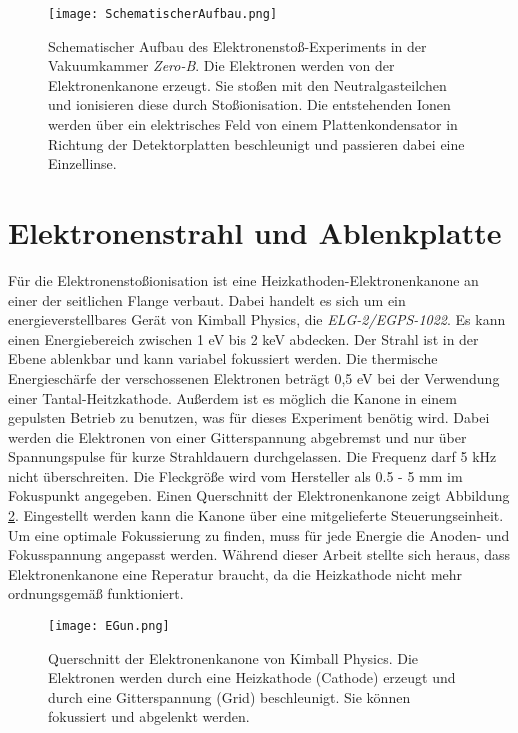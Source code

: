\begin{figure}
    \centering
    \texttt{[image: SchematischerAufbau.png]}
    \caption[Schematischer Aufbau des Experiments]{Schematischer Aufbau des Elektronenstoß-Experiments in der Vakuumkammer \textit{Zero-B}. Die Elektronen werden von der Elektronenkanone erzeugt. Sie stoßen mit den Neutralgasteilchen und ionisieren diese durch Stoßionisation. Die entstehenden Ionen werden über ein elektrisches Feld von einem Plattenkondensator in Richtung der Detektorplatten beschleunigt und passieren dabei eine Einzellinse.}
    \label{fig:Aufbau}
\end{figure}

\section{Elektronenstrahl und Ablenkplatte}
Für die Elektronenstoßionisation ist eine Heizkathoden-Elektronenkanone an einer der seitlichen Flange verbaut. Dabei handelt es sich um ein energieverstellbares Gerät von Kimball Physics, die \textit{ELG-2/EGPS-1022}. Es kann einen Energiebereich zwischen 1 eV bis 2 keV abdecken. Der Strahl ist in der Ebene ablenkbar und kann variabel fokussiert werden. Die thermische Energieschärfe der verschossenen Elektronen beträgt 0,5 eV bei der Verwendung einer Tantal-Heitzkathode. Außerdem ist es möglich die Kanone in einem gepulsten Betrieb zu benutzen, was für dieses Experiment benötig wird. Dabei werden die Elektronen von einer Gitterspannung abgebremst und nur über Spannungspulse für kurze Strahldauern durchgelassen. Die Frequenz darf 5 kHz nicht überschreiten. Die Fleckgröße wird vom Hersteller als 0.5 - 5 mm im Fokuspunkt angegeben. Einen Querschnitt der Elektronenkanone zeigt Abbildung \ref{fig:EGun}. Eingestellt werden kann die Kanone über eine mitgelieferte Steuerungseinheit. Um eine optimale Fokussierung zu finden, muss für jede Energie die Anoden- und Fokusspannung angepasst werden. Während dieser Arbeit stellte sich heraus, dass Elektronenkanone eine Reperatur braucht, da die Heizkathode nicht mehr ordnungsgemäß funktioniert.

\begin{figure}
    \centering
    \texttt{[image: EGun.png]}
    \caption[Querschnitt der Elektronenkanone]{Querschnitt der Elektronenkanone von Kimball Physics. Die Elektronen werden durch eine Heizkathode (Cathode) erzeugt und durch eine Gitterspannung (Grid) beschleunigt. Sie können fokussiert und abgelenkt werden.}
    \label{fig:EGun}
\end{figure}

